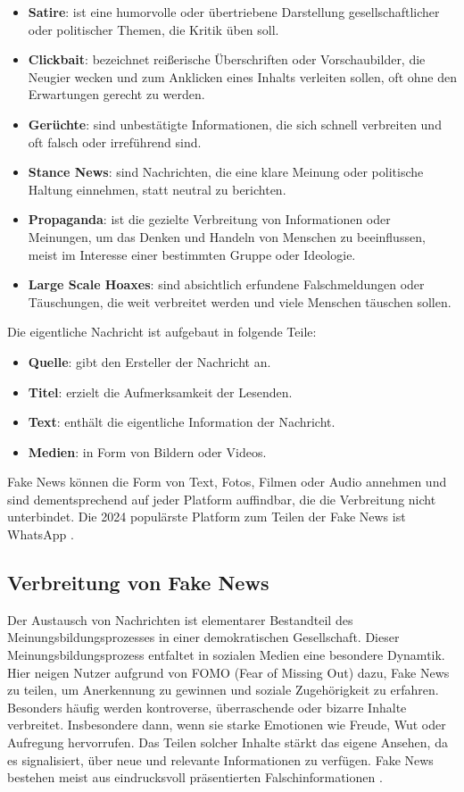 \begin{itemize}
    \item \textbf{Satire}: ist eine humorvolle oder übertriebene Darstellung gesellschaftlicher oder politischer Themen, die Kritik üben soll.
    \item \textbf{Clickbait}: bezeichnet reißerische Überschriften oder Vorschaubilder, die Neugier wecken und zum Anklicken eines Inhalts verleiten sollen, oft ohne den Erwartungen gerecht zu werden.
    \item \textbf{Gerüchte}: sind unbestätigte Informationen, die sich schnell verbreiten und oft falsch oder irreführend sind.
    \item \textbf{Stance News}: sind Nachrichten, die eine klare Meinung oder politische Haltung einnehmen, statt neutral zu berichten.
    \item \textbf{Propaganda}: ist die gezielte Verbreitung von Informationen oder Meinungen, um das Denken und Handeln von Menschen zu beeinflussen, meist im Interesse einer bestimmten Gruppe oder Ideologie.
    \item \textbf{Large Scale Hoaxes}: sind absichtlich erfundene Falschmeldungen oder Täuschungen, die weit verbreitet werden und viele Menschen täuschen sollen.
\end{itemize}

Die eigentliche Nachricht ist aufgebaut in folgende Teile:

\begin{itemize}
    \item \textbf{Quelle}: gibt den Ersteller der Nachricht an.
    \item \textbf{Titel}: erzielt die Aufmerksamkeit der Lesenden.
    \item \textbf{Text}: enthält die eigentliche Information der Nachricht.
    \item \textbf{Medien}: in Form von Bildern oder Videos.
\end{itemize}

Fake News können die Form von Text, Fotos, Filmen oder Audio annehmen und sind dementsprechend auf jeder Platform auffindbar, 
die die Verbreitung nicht unterbindet. Die 2024 populärste Platform zum Teilen der Fake News ist WhatsApp \cite{Ashish2024}.

\subsection{Verbreitung von Fake News}

Der Austausch von Nachrichten ist elementarer Bestandteil des Meinungsbildungsprozesses in einer demokratischen Gesellschaft. 
Dieser Meinungsbildungsprozess entfaltet in sozialen Medien eine besondere Dynamtik. 
Hier neigen Nutzer aufgrund von FOMO (Fear of Missing Out) dazu, Fake News zu teilen, um Anerkennung zu gewinnen und soziale Zugehörigkeit zu erfahren. 
Besonders häufig werden kontroverse, überraschende oder bizarre Inhalte verbreitet. Insbesondere dann, wenn sie starke Emotionen wie Freude, Wut oder Aufregung hervorrufen. 
Das Teilen solcher Inhalte stärkt das eigene Ansehen, da es signalisiert, über neue und relevante Informationen zu verfügen. 
Fake News bestehen meist aus eindrucksvoll präsentierten Falschinformationen \cite{socsci9100185}.

